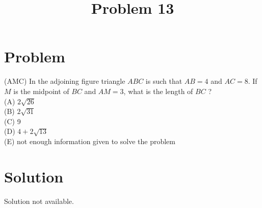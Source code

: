 \documentclass{article}
\title{Problem 13}
\date{}
\begin{document}
\maketitle

\section*{Problem}
(AMC) In the adjoining figure triangle \(A B C\) is such that \(A B=4\) and \(A C=8\). If \(M\) is the midpoint of \(B C\) and \(A M=3\), what is the length of \(B C\) ?\\
(A) \(2 \sqrt{26}\)\\
(B) \(2 \sqrt{31}\)\\
(C) 9\\
(D) \(4+2 \sqrt{13}\)\\
(E) not enough information given to solve the problem

\section*{Solution}
Solution not available.
\end{document}
